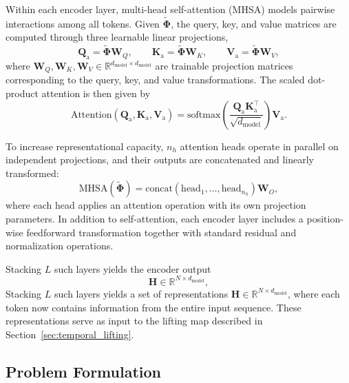 \documentclass[journal]{IEEEtran}
\newcommand{\mW}{\mathbf{W}}
\newcommand{\mH}{\mathbf{H}}
\newcommand{\mPhi}{\boldsymbol{\Phi}}
\newcommand{\mQa}{\mathbf{Q}_{\mathrm{a}}}
\newcommand{\mKa}{\mathbf{K}_{\mathrm{a}}}
\newcommand{\mVa}{\mathbf{V}_{\mathrm{a}}}
\begin{document}
Within each encoder layer, multi-head self-attention (MHSA) models pairwise interactions among all tokens. Given $\widetilde{\mPhi}$, the query, key, and value matrices are computed through three learnable linear projections,
\begin{equation}
    \mQa = \widetilde{\mPhi}\mW_Q, \qquad
    \mKa = \widetilde{\mPhi}\mW_K, \qquad
    \mVa = \widetilde{\mPhi}\mW_V,
    \label{eq:qkv}
\end{equation}
where $\mW_Q, \mW_K, \mW_V \in \mathbb{R}^{d_{\mathrm{model}} \times d_{\mathrm{model}}}$ are trainable projection matrices corresponding to the query, key, and value transformations. The scaled dot-product attention is then given by
\begin{equation}
    \mathrm{Attention}(\mQa,\mKa,\mVa)
    =
    \mathrm{softmax}\!\left(\frac{\mQa\mKa^\top}{\sqrt{d_{\mathrm{model}}}}\right)\mVa.
    \label{eq:attention}
\end{equation}

To increase representational capacity, $n_h$ attention heads operate in parallel on independent projections, and their outputs are concatenated and linearly transformed:
\begin{equation}
    \mathrm{MHSA}(\widetilde{\mPhi})
    =
    \mathrm{concat}(\mathrm{head}_1,\ldots,\mathrm{head}_{n_h})\mW_O,
    \label{eq:mhsa}
\end{equation}
where each head applies an attention operation with its own projection parameters. In addition to self-attention, each encoder layer includes a position-wise feedforward transformation together with standard residual and normalization operations.

Stacking $L$ such layers yields the encoder output
\begin{equation}
    \mH \in \mathbb{R}^{N \times d_{\mathrm{model}}},
\end{equation}
Stacking $L$ such layers yields a set of representations $\mH \in \mathbb{R}^{N \times d_{\mathrm{model}}}$, where each token now contains information from the entire input sequence. These representations serve as input to the lifting map described in Section~\ref{sec:temporal_lifting}.

\subsection{Problem Formulation}
\label{sec:problem}
\end{document}
